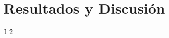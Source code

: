 \section{Resultados y Discusión}
\label{section:results}

\lipsum[1-2]
\f{1}
\lipsum[3]
\f{2}
\lipsum[4]
\lipsum[5]
\lipsum[6]
